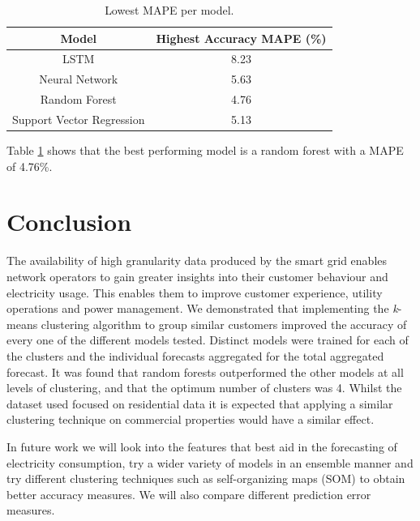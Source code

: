 \begin{table}
	\caption{Lowest MAPE per model.}
	\label{tab:results_mape}
	\begin{tabular}{cc}
		\toprule
		Model& Highest Accuracy MAPE (\%) \\
		\midrule
		LSTM & 8.23 \\
		Neural Network & 5.63 \\
		Random Forest & 4.76  \\
		Support Vector Regression & 5.13  \\
		\bottomrule
	\end{tabular}
\end{table}

Table \ref{tab:results_mape} shows that the best performing model is a random forest with a MAPE of 4.76\%. 

\section{Conclusion}

The availability of high granularity data produced by the smart grid enables network operators to gain greater insights into their customer behaviour and electricity usage. This enables them to improve customer experience, utility operations and power management. We demonstrated that implementing the \textit{k}-means clustering algorithm to group similar customers improved the accuracy of every one of the different models tested. Distinct models were trained for each of the clusters and the individual forecasts aggregated for the total aggregated forecast. It was found that random forests outperformed  the other models at all levels of clustering, and that the optimum number of clusters was 4. Whilst the dataset used focused on residential data it is expected that applying a similar clustering technique on commercial properties would have a similar effect.

In future work we will look into the features that best aid in the forecasting of electricity consumption, try a wider variety of models in an ensemble manner and try different clustering techniques such as self-organizing maps (SOM) to obtain better accuracy measures. We will also compare different prediction error measures.



